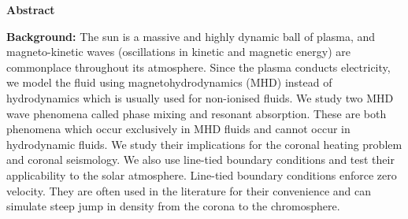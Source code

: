 \thispagestyle{plain}
\begin{center}
    
    
    
    \textbf{Abstract}
\end{center}

\begin{spacing}{1.1}

\noindent 

\textbf{Background:} 
The sun is a massive and highly dynamic ball of plasma, and magneto-kinetic waves (oscillations in kinetic and magnetic energy) are commonplace throughout its atmosphere. Since the plasma conducts electricity, we model the fluid using magnetohydrodynamics (MHD) instead of hydrodynamics which is usually used for non-ionised fluids. We study two MHD wave phenomena called phase mixing and resonant absorption. These are both phenomena which occur exclusively in MHD fluids and cannot occur in hydrodynamic fluids. We study their implications for the coronal heating problem and coronal seismology. We also use line-tied boundary conditions and test their applicability to the solar atmosphere. Line-tied boundary conditions enforce zero velocity. They are often used in the literature for their convenience and can simulate steep jump in density from the corona to the chromosphere.


\end{spacing}
